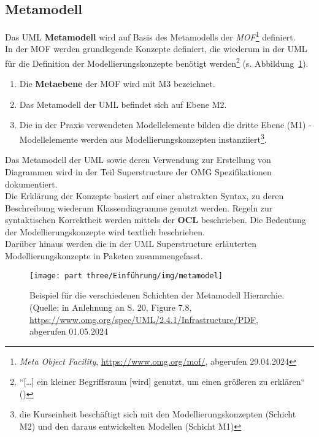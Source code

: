 \subsection*{Metamodell}
Das UML \textbf{Metamodell} wird auf Basis des Metamodells der \textit{MOF}\footnote{
\textit{Meta Object Facility}, \url{https://www.omg.org/mof/}, abgerufen 29.04.2024
} definiert.\\
In der MOF werden grundlegende Konzepte definiert, die wiederum in der UML für die Definition der Modellierungskonzepte benötigt werden\footnote{
``[\ldots] ein kleiner Begriffsraum [wird] genutzt, um einen größeren zu erklären`` (\cite[5]{Buh09})
} (s. Abbildung~\ref{fig:metamodel}).

\begin{enumerate}
    \item Die \textbf{Metaebene} der MOF wird mit M3 bezeichnet.
    \item Das Metamodell der UML befindet sich auf Ebene M2.
    \item Die in der Praxis verwendeten Modellelemente bilden die dritte Ebene (M1) - Modellelemente werden aus Modellierungskonzepten instanziiert\footnote{
    die Kurseinheit beschäftigt sich mit den Modellierungskonzepten (Schicht M2) und den daraus entwickelten Modellen (Schicht M1)
    }.
\end{enumerate}

\noindent
Das Metamodell der UML sowie deren Verwendung zur Erstellung von Diagrammen wird in der Teil Superstructure der OMG Spezifikationen dokumentiert.\\
Die Erklärung der Konzepte basiert auf einer abstrakten Syntax, zu deren Beschreibung wiederum Klassendiagramme genutzt werden.
Regeln zur syntaktischen Korrektheit werden mittels der \textbf{OCL} beschrieben.
Die Bedeutung der Modellierungskonzepte wird textlich beschrieben.\\
Darüber hinaus werden die in der UML Superstructure erläuterten Modellierungskonzepte in Paketen zusammengefasst.


\begin{figure}
    \centering
    \texttt{[image: part three/Einführung/img/metamodel]}
    \caption{Beispiel für die verschiedenen Schichten der Metamodell Hierarchie. (Quelle: in Anlehnung an S. 20, Figure 7.8, \url{https://www.omg.org/spec/UML/2.4.1/Infrastructure/PDF}, abgerufen 01.05.2024}
    \label{fig:metamodel}
\end{figure}
